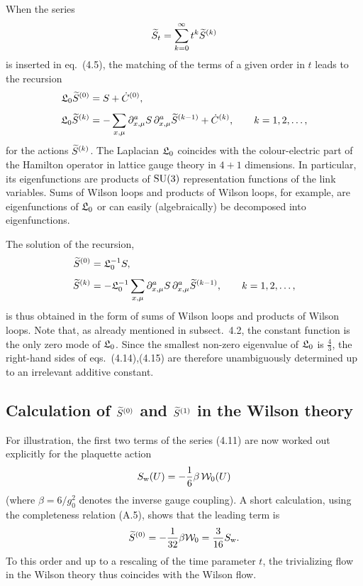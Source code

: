 When the series
\begin{equation}
  \widetilde{S}_t=\sum_{k=0}^{\infty}t^k\widetilde{S}^{(k)}
\end{equation}
is inserted in eq.~(4.5),
the matching of the terms of a given order in $t$ leads to the
recursion
\begin{align}
  \mathfrak{L}_0\widetilde{S}^{(0)}&=S+\dot{C}^{(0)},
  \\[1.0ex]
  \mathfrak{L}_0\widetilde{S}^{(k)}&
  =-\sum_{x,\mu}\partial^a_{x,\mu}S\,\partial^a_{x,\mu}\widetilde{S}^{(k-1)}
  +\dot{C}^{(k)},\qquad
  k=1,2,\ldots,
\end{align}
for the actions $\widetilde{S}^{(k)}$.
The Laplacian $\mathfrak{L}_0$ coincides with the colour-electric
part of the Hamilton operator in lattice gauge theory
in $4+1$ dimensions.
In particular, its eigenfunctions are products
of $\mathrm{SU}(3)$ representation
functions of the link variables.
Sums of
Wilson loops and products of Wilson loops, for example,
are eigenfunctions of $\mathfrak{L}_0$
or can easily (algebraically) be
decomposed into eigenfunctions.

The solution of the recursion,
\begin{align}
  \widetilde{S}^{(0)}&=\mathfrak{L}_0^{-1}S,
  \\[1.0ex]
  \widetilde{S}^{(k)}&=-\mathfrak{L}_0^{-1}
  \sum_{x,\mu}\partial^a_{x,\mu}S\,\partial^a_{x,\mu}
  \widetilde{S}^{(k-1)},\qquad k=1,2,\ldots,
\end{align}
is thus obtained in the form of sums of
Wilson loops and products of Wilson loops.
Note that,
as already mentioned in subsect.~4.2,
the constant function is the only zero mode of $\mathfrak{L}_0$.
Since the smallest non-zero eigenvalue
of $\mathfrak{L}_0$ is $\frac{4}{3}$,
the right-hand sides of
eqs.~(4.14),(4.15) are therefore unambiguously determined
up to an irrelevant additive constant.


\subsection{Calculation of\/ $\widetilde{S}^{(0)}$ and\/ $\widetilde{S}^{(1)}$
                in the Wilson theory}

For illustration, the first two terms of the
series (4.11)
are now worked out explicitly for the plaquette action~\cite{Wilson}
\begin{equation}
  S_{\mathrm{w}}(U)=-\frac{1}{6}\beta\,\mathcal{W}_0(U)
\end{equation}
(where $\beta=6/g_0^2$ denotes the inverse gauge coupling).
A short calculation,
using the completeness relation (A.5),
shows that the leading term is
\begin{equation}
  \widetilde{S}^{(0)}=-\frac{1}{32}\beta\mathcal{W}_0=\frac{3}{16}S_{\mathrm{w}}.
\end{equation}
To this order and up to
a rescaling of the time parameter $t$, the trivializing
flow in the Wilson theory thus coincides with the Wilson flow.

